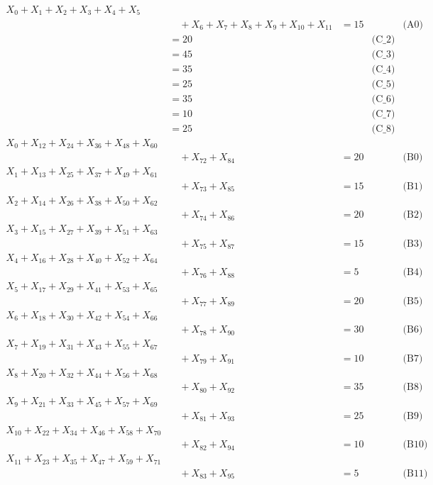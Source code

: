 \documentclass[a4paper,10pt]{article}
\begin{document}
\allowdisplaybreaks
{\small
\begin{align}
X_{0} + X_{1} + X_{2} + X_{3} + X_{4} + X_{5} \\[0.1ex]
&\quad  + X_{6} + X_{7} + X_{8} + X_{9} + X_{10} + X_{11} &= 15 && \text{(A0)} \\
 &= 20 && \text{(C\_2)} \\
 &= 45 && \text{(C\_3)} \\
 &= 35 && \text{(C\_4)} \\
 &= 25 && \text{(C\_5)} \\
\allowbreak
 &= 35 && \text{(C\_6)} \\
 &= 10 && \text{(C\_7)} \\
 &= 25 && \text{(C\_8)} \\
X_{0} + X_{12} + X_{24} + X_{36} + X_{48} + X_{60} \\[0.1ex]
&\quad  + X_{72} + X_{84} &= 20 && \text{(B0)} \\
X_{1} + X_{13} + X_{25} + X_{37} + X_{49} + X_{61} \\[0.1ex]
&\quad  + X_{73} + X_{85} &= 15 && \text{(B1)} \\
\allowbreak
X_{2} + X_{14} + X_{26} + X_{38} + X_{50} + X_{62} \\[0.1ex]
&\quad  + X_{74} + X_{86} &= 20 && \text{(B2)} \\
X_{3} + X_{15} + X_{27} + X_{39} + X_{51} + X_{63} \\[0.1ex]
&\quad  + X_{75} + X_{87} &= 15 && \text{(B3)} \\
X_{4} + X_{16} + X_{28} + X_{40} + X_{52} + X_{64} \\[0.1ex]
&\quad  + X_{76} + X_{88} &= 5 && \text{(B4)} \\
X_{5} + X_{17} + X_{29} + X_{41} + X_{53} + X_{65} \\[0.1ex]
&\quad  + X_{77} + X_{89} &= 20 && \text{(B5)} \\
X_{6} + X_{18} + X_{30} + X_{42} + X_{54} + X_{66} \\[0.1ex]
&\quad  + X_{78} + X_{90} &= 30 && \text{(B6)} \\
\allowbreak
X_{7} + X_{19} + X_{31} + X_{43} + X_{55} + X_{67} \\[0.1ex]
&\quad  + X_{79} + X_{91} &= 10 && \text{(B7)} \\
X_{8} + X_{20} + X_{32} + X_{44} + X_{56} + X_{68} \\[0.1ex]
&\quad  + X_{80} + X_{92} &= 35 && \text{(B8)} \\
X_{9} + X_{21} + X_{33} + X_{45} + X_{57} + X_{69} \\[0.1ex]
&\quad  + X_{81} + X_{93} &= 25 && \text{(B9)} \\
X_{10} + X_{22} + X_{34} + X_{46} + X_{58} + X_{70} \\[0.1ex]
&\quad  + X_{82} + X_{94} &= 10 && \text{(B10)} \\
X_{11} + X_{23} + X_{35} + X_{47} + X_{59} + X_{71} \\[0.1ex]
&\quad  + X_{83} + X_{95} &= 5 && \text{(B11)} \\
\end{align}
}
\end{document}
